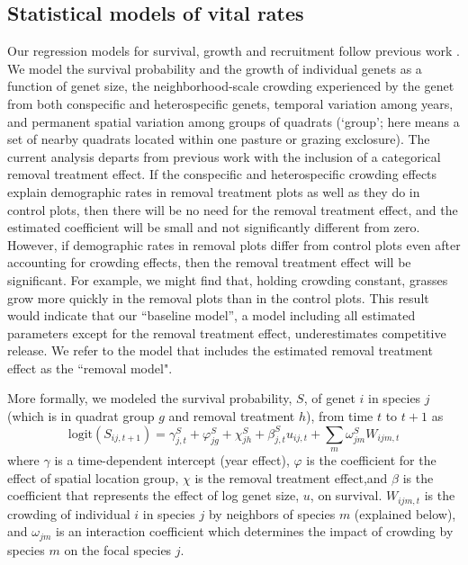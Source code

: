 \documentclass[11pt]{article}
\begin{document}
\begin{doublespacing}
\subsection*{Statistical models of vital rates}

Our regression models for survival, growth and recruitment follow previous work \citep{adler_coexistence_2010,chu_large_2015}. We model the survival probability and the growth of individual genets as a function of genet size, the neighborhood-scale crowding experienced by the genet from both conspecific and heterospecific genets, temporal variation among years, and permanent spatial variation among groups of quadrats (`group'; here means a set of nearby quadrats located within one pasture or grazing exclosure). The current analysis departs from previous work with the inclusion of a categorical removal treatment effect. If the conspecific and heterospecific crowding effects explain demographic rates in removal treatment plots as well as they do in control plots, then there will be no need for the removal treatment effect, and the estimated coefficient will be small and not significantly different from zero. However, if demographic rates in removal plots differ from control plots even after accounting for crowding effects, then the removal treatment effect will be significant. For example, we might find that, holding crowding constant, grasses grow more quickly in the removal plots than in the control plots. This result would indicate that our ``baseline model'', a model including all estimated parameters except for the removal treatment effect, underestimates competitive release. We refer to the model that includes the estimated removal treatment effect as the ``removal model". 

More formally, we modeled the survival probability, $S$, of genet $i$ in species $j$ (which is in quadrat group $g$ and removal treatment $h$), 
from time $t$ to $t+1$  as
\begin{equation}
\mbox{logit}(S_{ij,t+1}) = \gamma_{j,t}^S + \varphi_{jg}^S+  \chi_{jh}^S  + \beta_{j,t}^S u_{ij,t} +  
\sum \limits_{m} \omega_{jm}^S {W}_{ijm,t}
\label{eqn:survReg}
\end{equation}
where $\gamma$ is a time-dependent intercept (year effect), $\varphi$ is the coefficient for the 
effect of spatial location group, $\chi$ is the removal treatment effect,and  $\beta$ is the coefficient that 
represents the effect of log genet size, $u$, on survival. 
$W_{ijm,t}$ is the crowding of individual $i$ in species $j$ by neighbors of species $m$ (explained below), and 
$\omega_{jm}$ is an interaction coefficient which determines the impact of crowding by species $m$ on the focal species $j$. 


\end{doublespacing}
\end{document}
